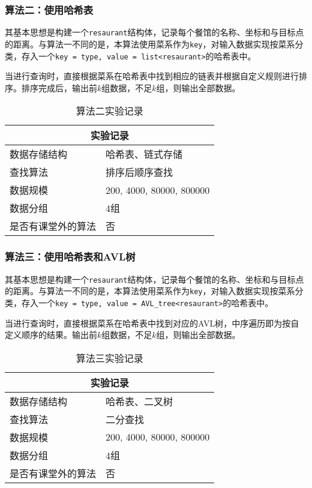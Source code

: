 \documentclass{article}
\begin{document}
\subsubsection{算法二：使用哈希表}
其基本思想是构建一个\texttt{resaurant}结构体，记录每个餐馆的名称、坐标和与目标点的距离。与算法一不同的是，本算法使用菜系作为\texttt{key}，对输入数据实现按菜系分类，存入一个\texttt{key = type, value = list<resaurant>}的哈希表中。

当进行查询时，直接根据菜系在哈希表中找到相应的链表并根据自定义规则进行排序。排序完成后，输出前$k$组数据，不足$k$组，则输出全部数据。
\begin{table}[H]
    \centering
    \begin{tabular}{|p{4cm}<{\centering}|p{6cm}<{\centering}|}
        \hline
        \multicolumn{2}{|c|}{实验记录}                \\
        \hline
        数据存储结构       & 哈希表、链式存储         \\
        \hline
        查找算法           & 排序后顺序查找           \\
        \hline
        数据规模           & 200, 4000, 80000, 800000 \\
        \hline
        数据分组           & 4组                      \\
        \hline
        是否有课堂外的算法 & 否                       \\
        \hline
    \end{tabular}
    \caption{算法二实验记录}
\end{table}
\subsubsection{算法三：使用哈希表和AVL树}
其基本思想是构建一个\texttt{resaurant}结构体，记录每个餐馆的名称、坐标和与目标点的距离。与算法一不同的是，本算法使用菜系作为\texttt{key}，对输入数据实现按菜系分类，存入一个\texttt{key = type, value = AVL\_tree<resaurant>}的哈希表中。

当进行查询时，直接根据菜系在哈希表中找到对应的AVL树，中序遍历即为按自定义顺序的结果。输出前$k$组数据，不足$k$组，则输出全部数据。
\begin{table}[H]
    \centering
    \begin{tabular}{|p{4cm}<{\centering}|p{6cm}<{\centering}|}
        \hline
        \multicolumn{2}{|c|}{实验记录}                \\
        \hline
        数据存储结构       & 哈希表、二叉树           \\
        \hline
        查找算法           & 二分查找                 \\
        \hline
        数据规模           & 200, 4000, 80000, 800000 \\
        \hline
        数据分组           & 4组                      \\
        \hline
        是否有课堂外的算法 & 否                       \\
        \hline
    \end{tabular}
    \caption{算法三实验记录}
\end{table}
\end{document}
